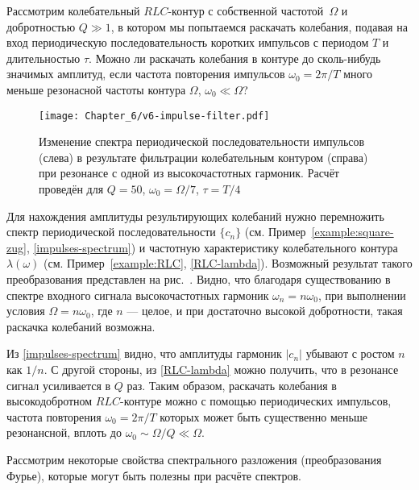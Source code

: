 \begin{lab:example}\label{example:zug-RLC}
Рассмотрим колебательный $RLC$-контур с собственной
частотой~$\Omega$ и добротностью $Q\gg 1$, в котором мы попытаемся раскачать колебания,
подавая на вход периодическую последовательность коротких импульсов
с периодом $T$ и длительностью $\tau$. Можно ли раскачать колебания в контуре
до сколь-нибудь значимых амплитуд, если частота повторения импульсов
$\omega_0=2\pi/T$ много меньше резонасной частоты контура $\Omega$,
$\omega_0\ll \Omega$?

\begin{figure}[h!]
 \centering\texttt{[image: Chapter\_6/v6-impulse-filter.pdf]}
 \caption{\footnotesize Изменение спектра периодической последовательности импульсов (слева)
 в результате фильтрации колебательным контуром (справа) при резонансе с одной
 из высокочастотных гармоник. Расчёт проведён
 для $Q=50$, $\omega_0=\Omega/7$, $\tau=T/4$}
\end{figure}

Для нахождения амплитуды результирующих колебаний нужно перемножить
спектр периодической последовательности $\{c_n\}$
(см. Пример~\ref{example:square-zug}, \eqref{impulses-spectrum})
и частотную характеристику колебательного контура $\lambda(\omega)$
(см. Пример~\ref{example:RLC}, \eqref{RLC-lambda}).
Возможный результат такого преобразования представлен на рис.~.
Видно, что благодаря существованию в спектре входного сигнала высокочастотных
гармоник $\omega_n = n \omega_0$, при выполнении условия
$\Omega = n \omega_0$, где $n$ --- целое, и при достаточно высокой добротности,
такая раскачка колебаний возможна.

Из \eqref{impulses-spectrum} видно, что амплитуды гармоник $|c_n|$ убывают
с ростом $n$ как $1/n$. С другой стороны, из \eqref{RLC-lambda} можно получить,
что в резонансе сигнал усиливается в $Q$ раз.
Таким образом, раскачать колебания в высокодобротном $RLC$-контуре можно
с помощью периодических импульсов, частота повторения $\omega_0=2\pi/T$
которых может быть существенно меньше резонансной,
вплоть до $\omega_0 \sim \Omega / Q \ll \Omega $.
\end{lab:example}


Рассмотрим некоторые свойства спектрального разложения (преобразования Фурье),
которые могут быть полезны при расчёте спектров.

